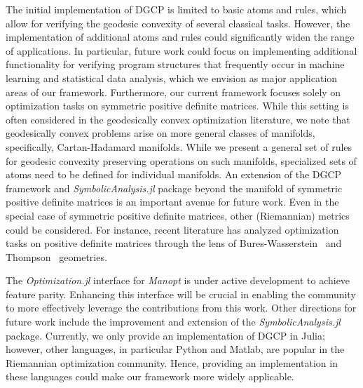 \documentclass[twoside,11pt]{article}
\begin{document}
The initial implementation of DGCP is limited to basic atoms and rules, which allow for verifying the geodesic convexity of several classical tasks. However, the implementation of additional atoms and rules could significantly widen the range of applications. In particular, future work could focus on implementing additional functionality for verifying program structures that frequently occur in machine learning and statistical data analysis, which we envision as major application areas of our framework. Furthermore, our current framework focuses solely on optimization tasks on symmetric positive definite matrices. While this setting is often considered in the geodesically convex optimization literature, we note that geodesically convex problems arise on more general classes of manifolds, specifically, Cartan-Hadamard manifolds. While we present a general set of rules for geodesic convexity preserving operations on such manifolds, specialized sets of atoms need to be defined for individual manifolds. An extension of the DGCP framework and \textsl{SymbolicAnalysis.jl} package beyond the manifold of symmetric positive definite matrices is an important avenue for future work. Even in the special case of symmetric positive definite matrices, other (Riemannian) metrics could be considered. For instance, recent literature has analyzed optimization tasks on positive definite matrices through the lens of Bures-Wasserstein~\citep{chewi2020gradient} and Thompson~\citep{thompson} geometries. 

The \textsl{Optimization.jl} interface for \textsl{Manopt} is under active development to achieve feature parity. Enhancing this interface will be crucial in enabling the community to more effectively leverage the contributions from this work. Other directions for future work include the improvement and extension of the \textsl{SymbolicAnalysis.jl} package. Currently, we only provide an implementation of DGCP in Julia; however, other languages, in particular Python and Matlab, are popular in the Riemannian optimization community. Hence, providing an implementation in these languages could make our framework more widely applicable. 
\end{document}
